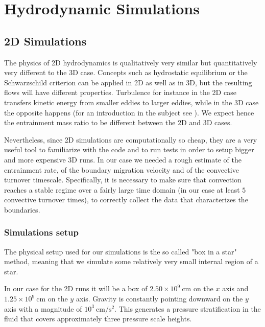 
\chapter{Hydrodynamic Simulations}
\section{2D Simulations}
The physics of 2D hydrodynamics is qualitatively very similar but quantitatively very different to the 3D case. Concepts such as hydrostatic equilibrium or the Schwarzschild criterion can be applied in 2D as well as in 3D, but the resulting flows will have different properties. Turbulence for instance in the 2D case transfers kinetic energy from smaller eddies to larger eddies, while in the 3D case the opposite happens (for an introduction in the subject see \citet{boffetta}). We expect hence the entrainment mass ratio to be different between the 2D and 3D cases. 

Nevertheless, since 2D simulations are computationally so cheap, they are a very useful tool to familiarize with the code and to run tests in order to setup bigger and more expensive 3D runs. In our case we needed a rough estimate of the entrainment rate, of the boundary migration velocity and of the convective turnover timescale. Specifically, it is necessary to make sure that convection reaches a stable regime over a fairly large time domain (in our case at least $5$ convective turnover times), to correctly collect the data that characterizes the boundaries.
	
\subsection{Simulations setup}
The physical setup used for our simulations is the so called "box in a star" method, meaning that we simulate some relatively very small internal region of a star. 

In our case for the 2D runs it will be a box of $2.50 \times 10^{9} \ \mathrm{cm}$ on the $x$ axis and $1.25 \times 10^{9} \ \mathrm{cm}$ on the $y$ axis. Gravity is constantly pointing downward on the $y$ axis with a magnitude of $10^3 \ \mathrm{cm/s^2}$. This generates a pressure stratification in the fluid that covers approximately three pressure scale heights. 


